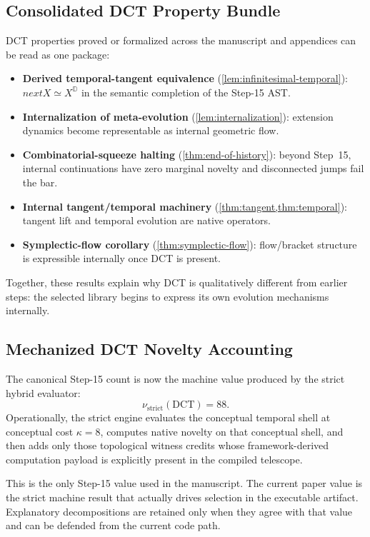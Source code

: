 \documentclass[11pt,a4paper]{article}
\def\bigcirc{next}%
\theoremstyle{plain}
\theoremstyle{definition}
\theoremstyle{remark}
\newcommand{\D}{\mathbb{D}}
\begin{document}
\subsection{Consolidated DCT Property Bundle}

DCT properties proved or formalized across the manuscript and appendices can be read as one package:
\begin{itemize}[nosep]
    \item \textbf{Derived temporal-tangent equivalence} (\cref{lem:infinitesimal-temporal}): $\bigcirc X \simeq X^\D$ in the semantic completion of the Step-15 AST.
    \item \textbf{Internalization of meta-evolution} (\cref{lem:internalization}): extension dynamics become representable as internal geometric flow.
    \item \textbf{Combinatorial-squeeze halting} (\cref{thm:end-of-history}): beyond Step~15, internal continuations have zero marginal novelty and disconnected jumps fail the bar.
    \item \textbf{Internal tangent/temporal machinery} (\cref{thm:tangent,thm:temporal}): tangent lift and temporal evolution are native operators.
    \item \textbf{Symplectic-flow corollary} (\cref{thm:symplectic-flow}): flow/bracket structure is expressible internally once DCT is present.
\end{itemize}

Together, these results explain why DCT is qualitatively different from earlier steps: the selected library begins to express its own evolution mechanisms internally.

\subsection{Mechanized DCT Novelty Accounting}

The canonical Step-15 count is now the machine value produced by the strict hybrid evaluator:
\[
  \nu_{\mathrm{strict}}(\mathrm{DCT}) = 88.
\]
Operationally, the strict engine evaluates the conceptual temporal shell at conceptual cost $\kappa = 8$, computes native novelty on that conceptual shell, and then adds only those topological witness credits whose framework-derived computation payload is explicitly present in the compiled telescope.

This is the only Step-15 value used in the manuscript.
The current paper value is the strict machine result that actually drives selection in the executable artifact.
Explanatory decompositions are retained only when they agree with that value and can be defended from the current code path.
\end{document}

